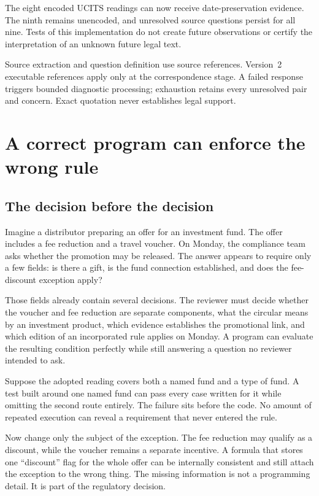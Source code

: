 \documentclass[12pt,a4paper,oneside,openany]{book}
\begin{document}
The eight encoded UCITS readings can now receive date-preservation evidence.
The ninth remains unencoded, and unresolved source questions persist for all
nine. Tests of this implementation do not create future observations or certify
the interpretation of an unknown future legal text.

Source extraction and question definition use source references. Version~2
executable references apply only at the correspondence stage. A failed response
triggers bounded diagnostic processing; exhaustion retains every unresolved
pair and concern. Exact quotation never establishes legal support.

\endgroup
\clearpage

\tableofcontents
\mainmatter
\chapter{A correct program can enforce the wrong rule}
\label{ch:problem}

\section{The decision before the decision}
\label{merge:M01:00}

\label{sec:problem-decision}
Imagine a distributor preparing an offer for an investment fund. The offer
includes a fee reduction and a travel voucher. On Monday, the compliance team
asks whether the promotion may be released. The answer appears to require only a
few fields: is there a gift, is the fund connection established, and does the
fee-discount exception apply?

Those fields already contain several decisions. The reviewer must decide whether
the voucher and fee reduction are separate components, what the circular means by
an investment product, which evidence establishes the promotional link, and
which edition of an incorporated rule applies on Monday. A program can evaluate
the resulting condition perfectly while still answering a question no reviewer
intended to ask.

Suppose the adopted reading covers both a named fund and a type of fund. A test
built around one named fund can pass every case written for it while omitting the
second route entirely. The failure sits before the code. No amount of repeated
execution can reveal a requirement that never entered the rule.

Now change only the subject of the exception. The fee reduction may qualify as a
discount, while the voucher remains a separate incentive. A formula that stores
one ``discount'' flag for the whole offer can be internally consistent and still
attach the exception to the wrong thing. The missing information is not a
programming detail. It is part of the regulatory decision.
\end{document}
